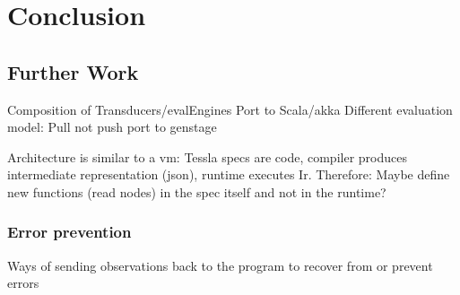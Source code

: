 %
\chapter{Conclusion}
\label{sec:conclusion}

\section{Further Work}
\label{sec:conclusion:further_work}

Composition of Transducers/evalEngines
Port to Scala/akka
Different evaluation model: Pull not push
port to genstage

Architecture is similar to a vm: Tessla specs are code, compiler produces intermediate representation (json), runtime executes Ir.
Therefore: Maybe define new functions (read nodes) in the spec itself and not in the runtime?

\subsection{Error prevention}
\label{sec:conclusion:further_work:error_prevention}
Ways of sending observations back to the program to recover from or prevent errors

